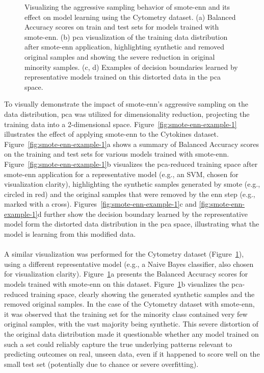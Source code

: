 \documentclass[12pt,a4paper]{report}
\begin{document}
\begin{figure}[h!]
    \caption[Visualizing \gls{smote}-\gls{enn} on Cytometry]{Visualizing the aggressive sampling behavior of \gls{smote}-\gls{enn} and its effect on model learning using the Cytometry dataset. (a) Balanced Accuracy scores on train and test sets for models trained with \gls{smote}-\gls{enn}. (b) \gls{pca} visualization of the training data distribution after \gls{smote}-\gls{enn} application, highlighting synthetic and removed original samples and showing the severe reduction in original minority samples. (c, d) Examples of decision boundaries learned by representative models trained on this distorted data in the \gls{pca} space.}

    \label{fig:smote-enn-example-2}
\end{figure}

\noindent
To visually demonstrate the impact of \gls{smote}-\gls{enn}'s aggressive sampling on the data distribution, \acrfull{pca} was utilized for dimensionality reduction, projecting the training data into a 2-dimensional space. Figure~\ref{fig:smote-enn-example-1} illustrates the effect of applying \gls{smote}-\gls{enn} to the Cytokines dataset. Figure~\ref{fig:smote-enn-example-1}a shows a summary of Balanced Accuracy scores on the training and test sets for various models trained with \gls{smote}-\gls{enn}. Figure~\ref{fig:smote-enn-example-1}b visualizes the \gls{pca}-reduced training space after \gls{smote}-\gls{enn} application for a representative model (e.g., an SVM, chosen for visualization clarity), highlighting the synthetic samples generated by \gls{smote} (e.g., circled in red) and the original samples that were removed by the \gls{enn} step (e.g., marked with a cross). Figures~\ref{fig:smote-enn-example-1}c and \ref{fig:smote-enn-example-1}d further show the decision boundary learned by the representative model form the distorted data distribution in the \gls{pca} space, illustrating what the model is learning from this modified data.\\
\\
A similar visualization was performed for the Cytometry dataset (Figure~\ref{fig:smote-enn-example-2}), using a different representative model (e.g., a Naive Bayes classifier, also chosen for visualization clarity). Figure~\ref{fig:smote-enn-example-2}a presents the Balanced Accuracy scores for models trained with \gls{smote}-\gls{enn} on this dataset. Figure~\ref{fig:smote-enn-example-2}b visualizes the \gls{pca}-reduced training space, clearly showing the generated synthetic samples and the removed original samples. In the case of the Cytometry dataset with \gls{smote}-\gls{enn}, it was observed that the training set for the minority class contained very few original samples, with the vast majority being synthetic. This severe distortion of the original data distribution made it questionable whether any model trained on such a set could reliably capture the true underlying patterns relevant to predicting outcomes on real, unseen data, even if it happened to score well on the small test set (potentially due to chance or severe overfitting).\\
\end{document}
